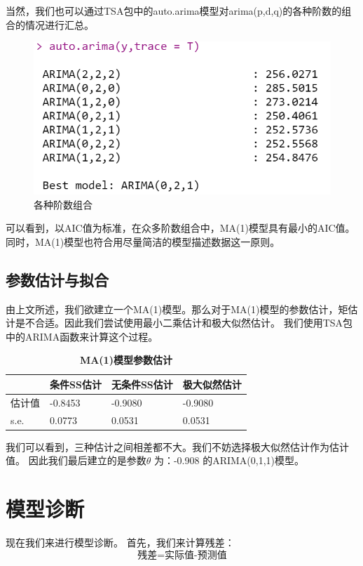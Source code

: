 \documentclass{article}
\begin{document}
	
	当然，我们也可以通过TSA包中的auto.arima模型对arima(p,d,q)的各种阶数的组合的情况进行汇总。
	
	
		\begin{figure}[h]
		\centering
		\includegraphics[width=.9\textwidth]{Rplot07.png}
		\caption{各种阶数组合}
	\end{figure}
	可以看到，以AIC值为标准，在众多阶数组合中，MA(1)模型具有最小的AIC值。同时，MA(1)模型也符合用尽量简洁的模型描述数据这一原则。
	
	
	\subsection{参数估计与拟合}
	
	由上文所述，我们欲建立一个MA(1)模型。那么对于MA(1)模型的参数估计，矩估计是不合适。因此我们尝试使用最小二乘估计和极大似然估计。
	我们使用TSA包中的ARIMA函数来计算这个过程。
	
	\begin{table}[H]
		\centering
		\caption{\textbf{MA(1)模型参数估计}} 
		\begin{tabular}{llll}
			\toprule
			& 条件SS估计  & 无条件SS估计 & 极大似然估计  \\  \hline
			估计值  & -0.8453 & -0.9080 & -0.9080 \\
			s.e. & 0.0773  & 0.0531  & 0.0531 \\ \bottomrule
		\end{tabular}
	\end{table}
	
	我们可以看到，三种估计之间相差都不大。我们不妨选择极大似然估计作为估计值。
	因此我们最后建立的是参数$
	\theta 
	$
	为：-0.908 的ARIMA(0,1,1)模型。
	
	\section{模型诊断}
	
	
	现在我们来进行模型诊断。
	首先，我们来计算残差：
	\begin{equation}
		\text{残差=实际值-预测值}
	\end{equation}
	
\end{document}
